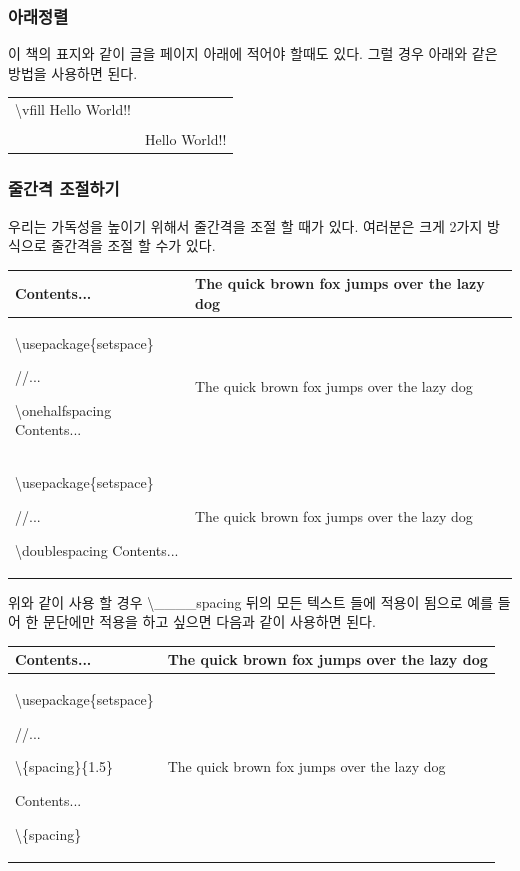\documentclass[12pt]{article}
\begin{document}
	\subsubsection{아래정렬}
	이 책의 표지와 같이 글을 페이지 아래에 적어야 할때도 있다. 그럴 경우 아래와 같은 방법을 사용하면 된다.\newline
	
	\begin{tabularx}{\textwidth \onehalfspacing}{|X|X|}
		\hline
		\textbackslash vfill Hello World!! & \\
		 & \\
		 & Hello World!!\\
		\hline
	\end{tabularx}
	\subsubsection{줄간격 조절하기}
	우리는 가독성을 높이기 위해서 줄간격을 조절 할 때가 있다. 여러분은 크게 2가지 방식으로 줄간격을 조절 할 수가 있다.\newline
	
	\begin{tabularx}{\textwidth}{|X|X|}
		\hline
		Contents... &The quick brown fox jumps over the lazy dog\\
		\hline
		\textbackslash usepackage\{setspace\} 
		
		//...
		
		\textbackslash onehalfspacing Contents... & \onehalfspacing The quick brown fox jumps over the lazy dog\\
		\hline
		\textbackslash usepackage\{setspace\} 
		
		//...
		
		\textbackslash  doublespacing Contents... & \doublespacing The quick brown fox jumps over the lazy dog\\
		\hline
	\end{tabularx}
	\newline
	\newline
	위와 같이 사용 할 경우 \textbackslash \_\_\_\_spacing 뒤의 모든 텍스트 들에 적용이 됨으로 예를 들어 한 문단에만 적용을 하고 싶으면 다음과 같이 사용하면 된다.\newline
	
	\begin{tabularx}{\textwidth}{|X|X|}
		\hline
		Contents... & The quick brown fox jumps over the lazy dog\\
		\hline
		\textbackslash usepackage\{setspace\} 
		
		//...
		
		\textbackslash \{spacing\}\{1.5\}
		
		Contents...
		
		\textbackslash \{spacing\} & \begin{spacing}{1.5} 
			The quick brown fox jumps over the lazy dog
		\end{spacing}\\
		\hline
	\end{tabularx}
\end{document}
